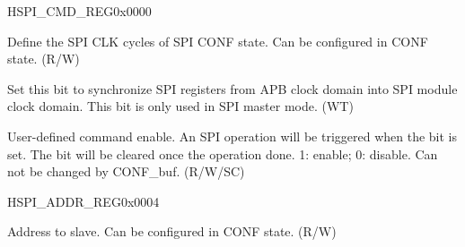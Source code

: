 \begin{register}{H}{SPI\_CMD\_REG}{0x0000}\label{regdesc:SPICMDREG}
%
%
%
%
%
\regnewline%
\begin{regdesc}\begin{reglist}
\label{fielddesc:SPICONFBITLEN}\item [SPI\_CONF\_BITLEN] Define the SPI CLK cycles of SPI CONF state. Can be configured in CONF state. (R/W)
\label{fielddesc:SPIUPDATE}\item [SPI\_UPDATE] Set this bit to synchronize SPI registers from APB clock domain into SPI module clock domain. This bit is only used in SPI master mode. (WT)
\label{fielddesc:SPIUSR}\item [SPI\_USR] User-defined command enable. An SPI operation will be triggered when the bit is set. The bit will be cleared once the operation done. 1: enable; 0: disable. Can not be changed by CONF\_buf. (R/W/SC)
\end{reglist}\end{regdesc}
\end{register}


\begin{register}{H}{SPI\_ADDR\_REG}{0x0004}\label{regdesc:SPIADDRREG}
%
\regnewline%
\begin{regdesc}\begin{reglist}
\label{fielddesc:SPIUSRADDRVALUE}\item [SPI\_USR\_ADDR\_VALUE] Address to slave. Can be configured in CONF state. (R/W)
\end{reglist}\end{regdesc}
\end{register}


